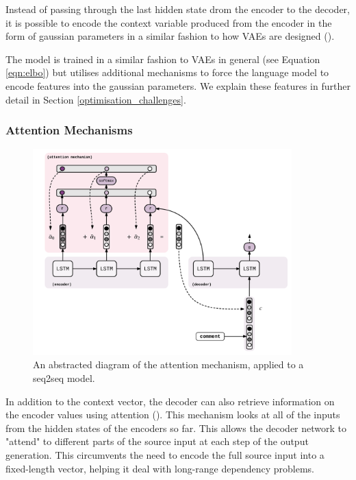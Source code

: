 \documentclass[12pt,twoside]{report}
\begin{document}
Instead of passing through the last hidden state drom the encoder to the decoder, it is possible to encode the context variable produced from the encoder in the form of gaussian parameters in a similar fashion to how VAEs are designed (\cite{bowman_generating_2015}).  

The model is trained in a similar fashion to VAEs in general (see Equation \ref{eqn:elbo}) but utilises additional mechanisms to force the language model to encode features into the gaussian parameters. We explain these features in further detail in Section \ref{optimisation_challenges}.

\subsubsection{Attention Mechanisms}

\begin{figure}[!ht]
      
	\centering
	\includegraphics[width=100mm]{diagrams/seq2seq_attention_mechanism.pdf}
	\caption{An abstracted diagram of the attention mechanism, applied to a seq2seq model.\label{seq2seq_attn}}
\end{figure}

In addition to the context vector, the decoder can also retrieve information on the encoder values using attention (\cite{bahdanau_neural_2014}). This mechanism looks at all of the inputs from the hidden states of the encoders so far. This allows the decoder network to "attend" to different parts of the source input at each step of the output generation. This circumvents the need to encode the full source input into a fixed-length vector, helping it deal with long-range dependency problems.
\end{document}
